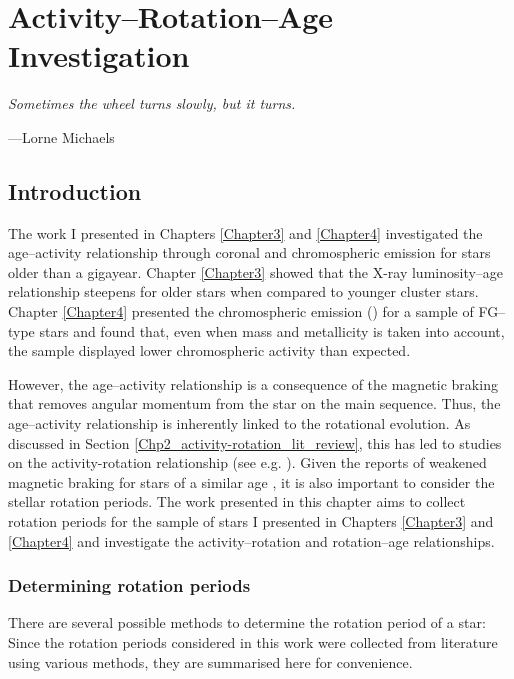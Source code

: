 
\chapter{Activity--Rotation--Age Investigation} %

\label{Chapter5} 

\epigraph{\itshape Sometimes the wheel turns slowly, but it turns.}{---Lorne Michaels}

\section{Introduction}

The work I presented in Chapters \ref{Chapter3} and \ref{Chapter4} investigated the age--activity relationship through coronal and chromospheric emission for stars older than a gigayear. Chapter \ref{Chapter3} \citep{Booth_etal_2017} showed that the X-ray luminosity--age relationship steepens for older stars when compared to younger cluster stars. Chapter \ref{Chapter4} presented the chromospheric emission (\Rprime) for a sample of FG--type stars and found that, even when mass and metallicity is taken into account, the sample displayed lower chromospheric activity than expected.

However, the age--activity relationship is a consequence of the magnetic braking that removes angular momentum from the star on the main sequence. Thus, the age--activity relationship is inherently linked to the rotational evolution. As discussed in Section \ref{Chp2_activity-rotation_lit_review}, this has led to studies on the activity-rotation relationship (see e.g. \citealt{Pizzolato_etal_2003,Wright_etal_2011}). Given the reports of weakened magnetic braking for stars of a similar age \citep{van_Saders_etal_2016}, it is also important to consider the stellar rotation periods. The work presented in this chapter aims to collect rotation periods for the sample of stars I presented in Chapters \ref{Chapter3} and \ref{Chapter4} and investigate the activity--rotation and rotation--age relationships.

\subsection{Determining rotation periods}
\label{Chp5_Prot_methods}

There are several possible methods to determine the rotation period of a star: Since the rotation periods considered in this work were collected from literature using various methods, they are summarised here for convenience.


